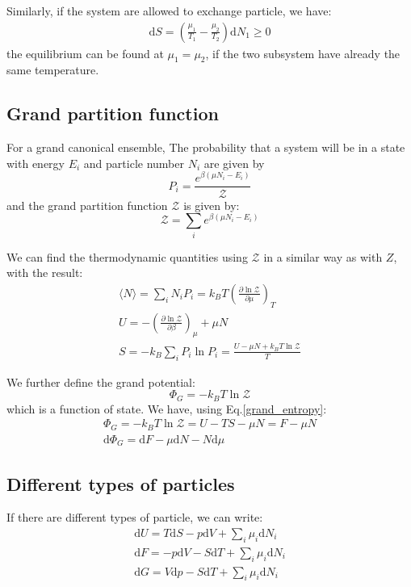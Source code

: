 \documentclass{article}
\newcommand{\pfrac}[2]{\frac{\partial #1}{\partial #2}}
\newcommand{\dnor}{\text{d}}
\begin{document}
Similarly, if the system are allowed to exchange particle, we have:
\begin{align}
    \dnor S = \left( \frac{\mu_1}{T_1} - \frac{\mu_2}{T_2} \right) \dnor N_1 \ge 0
\end{align}
the equilibrium can be found at $\mu_1 = \mu_2$, if the two subsystem have 
already the same temperature.

\subsection*{Grand partition function}
For a grand canonical ensemble, The probability that a system
will be in a state with energy $E_i$ and particle number $N_i$ are 
given by
\begin{equation}
    P_i = \frac{e^{\beta(\mu N_i - E_i)}}{\mathcal{Z}}
\end{equation}
and the grand partition function $\mathcal{Z}$ is given by:
\begin{equation}
    \mathcal{Z} = \sum_i e^{\beta(\mu N_i - E_i)}
\end{equation}

We can find the thermodynamic quantities using $\mathcal{Z}$ in 
a similar way as with $Z$, with the result:
\begin{gather}
   \langle N \rangle = \sum_i N_i P_i = k_B T \left( \pfrac{\ln \mathcal{Z}}{\mu} \right)_T \\
    U = - \left( \pfrac{\ln \mathcal{Z}}{\beta} \right)_{\mu} + \mu N \\
    S = -k_B \sum_i P_i \ln P_i = \frac{U - \mu N + k_B T\ln \mathcal{Z}}{T} \label{grand_entropy}
\end{gather}

We further define the grand potential:
\begin{equation}
    \Phi_G = -k_B T \ln \mathcal{Z}
\end{equation}
which is a function of state. We have, using Eq.\ref{grand_entropy}:
\begin{gather}
    \Phi_G = -k_B T \ln \mathcal{Z} = U - TS - \mu N = F - \mu N \\
    \dnor \Phi_G = \dnor F - \mu \dnor N - N \dnor \mu
\end{gather}

\subsection*{Different types of particles}
If there are different types of particle, we can write:
\begin{gather}
    \dnor U = T \dnor S - p \dnor V + \sum_i \mu_i \dnor N_i \\
    \dnor F = -p \dnor V - S \dnor T + \sum_i \mu_i \dnor N_i \\
    \dnor G = V \dnor p - S \dnor T + \sum_i \mu_i \dnor N_i 
\end{gather}
\end{document}
